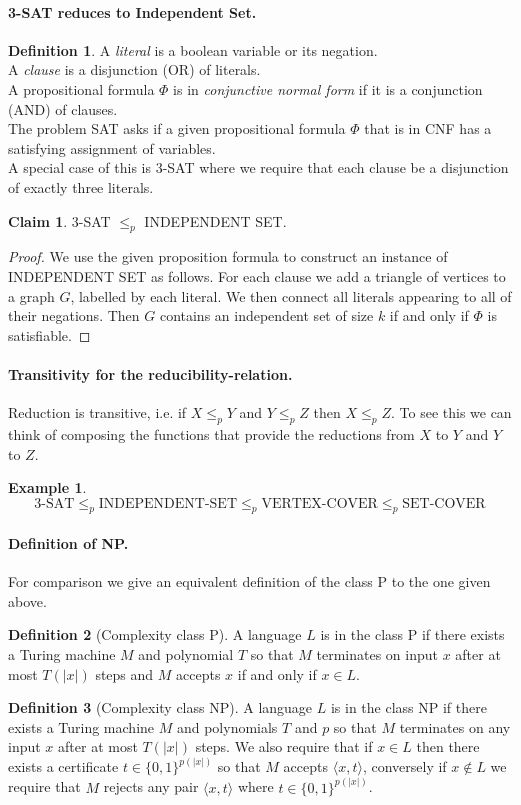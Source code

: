 \documentclass[11pt,a4paper]{article}
\theoremstyle{definition}
\newtheorem{claim}{Claim}
\newtheorem{defn}{Definition}
\newtheorem*{ex}{Example}
\begin{document}
\paragraph{3-SAT reduces to Independent Set.}
\begin{defn}
A \emph{literal} is a boolean variable or its negation.\\
A \emph{clause} is a disjunction (OR) of literals.\\
A propositional formula $\Phi$ is in \emph{conjunctive normal form} if it is a conjunction (AND) of clauses.\\
The problem SAT asks if a given propositional formula $\Phi$ that is in CNF has a satisfying assignment of variables.\\
A special case of this is 3-SAT where we require that each clause be a disjunction of exactly three literals.
\end{defn}
\begin{claim}
3-SAT $\le_p$ INDEPENDENT SET.
\end{claim}
\begin{proof}
We use the given proposition formula to construct an instance of INDEPENDENT SET as follows.
For each clause we add a triangle of vertices to a graph $G$, labelled by each literal.
We then connect all literals appearing to all of their negations.
Then $G$ contains an independent set of size $k$ if and only if $\Phi$ is satisfiable.
\end{proof}

\paragraph{Transitivity for the reducibility-relation.}
Reduction is transitive, i.e. if $X \le_p Y$ and $Y \le_p Z$ then $X\le_p Z$.
To see this we can think of composing the functions that provide the reductions from $X$ to $Y$ and $Y$ to $Z$.
\begin{ex}
\[
3\text{-SAT}\le_p \text{INDEPENDENT-SET} \le_p \text{VERTEX-COVER} \le_p \text{SET-COVER}
\]
\end{ex}

\paragraph{Definition of NP.}
For comparison we give an equivalent definition of the class P to the one given above.
\begin{defn}[Complexity class P]
A language $L$ is in the class P if there exists a Turing machine $M$ and polynomial $T$ so that $M$ terminates on input $x$ after at most $T(|x|)$ steps and $M$ accepts $x$ if and only if $x\in L$.
\end{defn}
\begin{defn}[Complexity class NP]
A language $L$ is in the class NP if there exists a Turing machine $M$ and polynomials $T$ and $p$ so that $M$ terminates on any input $x$ after at most $T(|x|)$ steps.
We also require that if $x\in L$ then there exists a certificate $t\in\{0,1\}^{p(|x|)}$ so that $M$ accepts $\langle x, t\rangle$, conversely if $x\not\in L$ we require that $M$ rejects any pair $\langle x,t\rangle$ where $t\in\{0,1\}^{p(|x|)}$.
\end{defn}
\end{document}
